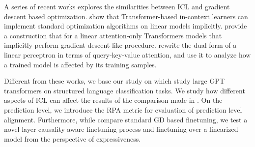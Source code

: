 A series of recent works explores the similarities between ICL and gradient descent based optimization. 
\cite{akyürek2023learning} show that Transformer-based in-context learners can implement standard optimization algorithms on linear models implicitly.
\cite{pmlr-v202-von-oswald23a} provide a construction that for a linear attention-only Transformers models that implicitly perform gradient descent like procedure.
\cite{irie22dual} rewrite the dual form of a linear perceptron in terms of query-key-value attention, and use it to analyze how a trained model is affected by its training samples.

Different from these works, we base our study on \cite{dai2023gpt} which study large GPT transformers on structured language classification tasks.
We study how different aspects of ICL can affect the results of the comparison made in \cite{dai2023gpt}.
On the prediction level, we introduce the RPA metric for evaluation of prediction level alignment.
Furthermore, while \cite{dai2023gpt} compare standard GD based finetuning, we test a novel layer causality aware finetuning process and finetuning over a linearized model from the perspective of expressiveness.